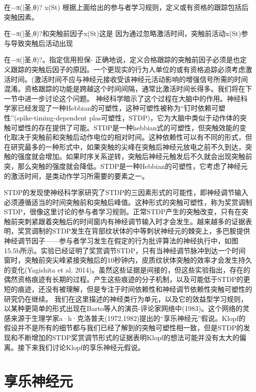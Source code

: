 在−π(|圣,θ)? x(St)
根据上面给出的参与者学习规则，定义或有资格的跟踪包括后突触因素。

在−π(|圣,θ)?和突触前因子x(St)这是
因为通过忽略激活时间，突触前活动x(St)参与导致突触后活动出现

在−π(|圣,θ)?。指定信用担保-
正确地说，定义合格跟踪的突触前因子必须是也定义跟踪的突触后因子的原因。一个更现实的行为人单位的或有资格追踪必须考虑激活时间。(激活时间不应与神经元接收受该神经元活动影响的增强信号所需的时间混淆。资格跟踪的功能是跨越这个时间间隔，通常比激活时间长得多。我们将在下一节中进一步讨论这个问题。
神经科学暗示了这个过程在大脑中的作用。神经科学家已经发现了一种Hebbian的可塑性，这种可塑性被称为“钉时依赖可塑性”(spike-timing-dependent plas可塑性，STDP)，它为大脑中类似于动作体的突触可塑性的存在提供了可能。STDP是一种hebbian式的可塑性，但突触效能的变化取决于突触前和突触后动作电位的相对时间。这种依赖性可以有不同的形式，但在研究最多的一种形式中，如果突触的尖峰在突触后神经元放电之前不久到达，突触的强度就会增加。如果时序关系逆转，突触后神经元触发后不久就会出现突触前突，那么突触的强度就会降低。STDP是一种Hebbian的可塑性，它考虑了神经元的激活时间，是类动作学习所需要的要素之一。


STDP的发现使神经科学家研究了STDP的三因素形式的可能性，即神经调节输入必须遵循适当的时间突触前和突触后峰值。这种形式的突触可塑性，称为奖赏调制STDP，很像这里讨论的参与者学习规则。正常STDP产生的突触改变，只有在突触前突刺紧跟着突触后的时间窗内有神经调节输入时才会发生。越来越多的证据表明，奖赏调制的STDP发生在背部纹状体的中等刺状神经元的棘突上，多巴胺提供神经调节因子——参与者学习发生在假定的行为批评算法的神经执行中，如图15.5b所示。实验已经证明了奖赏调节STDP，只有当神经调节脉冲到达一个时间窗时，突触前突尖峰紧接突触后的10秒钟内，皮质纹状体突触的效率才会发生持久的变化(Yagishita et al. 2014)。虽然这些证据是间接的，但这些实验指出，存在的偶然资格痕迹有长期的过程。产生这些痕迹的分子机制，以及可能低于STDP的更短的痕迹，还没有被理解，但是专注于时间依赖性和神经调节依赖性突触可塑性的研究仍在继续。
我们在这里描述的神经类行为单元，以及它的效益型学习规则，以某种更简单的形式出现在Barto等人的演员-评论家网络中(1983)。这个网络的灵感来源于生理学家a·h·克洛普夫(1972,1982)提出的“享乐神经元”假说。Klopf的假设并不是所有的细节都与我们已经了解到的突触可塑性相一致，但是STDP的发现和不断增加的STDP奖赏调节形式的证据表明Klopf的想法可能并没有太大的偏离。接下来我们讨论Klopf的享乐神经元假说。

\section{享乐神经元}

